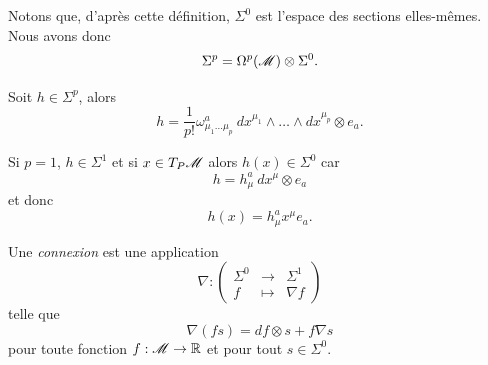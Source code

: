 \documentclass[a4paper,11pt]{report}
\begin{document}
                 Notons que, d'après cette définition, $\Sigma^0$ est l'espace des sections elles-mêmes. Nous avons donc
                 \begin{equation}
                    \Sigma^p = \Omega^p(\mathscr{M})\otimes\Sigma^0.
                \end{equation}
                
                \begin{exmp}
                    Soit $h\in \Sigma^p$, alors
                    \begin{equation}
                        h = \frac{1}{p!}\omega^a_{\mu_1\dots\mu_p}~dx^{\mu_1}\wedge\dots\wedge dx^{\mu_p}\otimes e_a.
                    \end{equation}
                    
                    Si $p=1$, $h\in\Sigma^1$ et si $x\in T_P\mathscr{M}$ alors $h(x)\in\Sigma^0$ car 
                    \begin{equation}
                        h = h^a_\mu~dx^\mu\otimes e_a
                    \end{equation}
                    et donc
                    \begin{equation}
                        h(x) = h^a_\mu x^\mu e_a.
                    \end{equation}
                \end{exmp}
                
                \begin{definition}
                    Une \textit{connexion} est une application
                    \begin{equation}
                    \nabla:\left(
                    \begin{array}{ccc}
                        \Sigma^0 & \longrightarrow & \Sigma^1 \\
                        f & \longmapsto & \nabla f
                    \end{array}
                    \right)
                    \end{equation}
                    telle que 
                    \begin{equation}
                        \nabla(fs) = df\otimes s+f\nabla s
                    \end{equation}
                    pour toute fonction $f:\mathscr{M}\to\mathbb{R}$ et pour tout $s\in\Sigma^0$.
                \end{definition}
                
\end{document}
